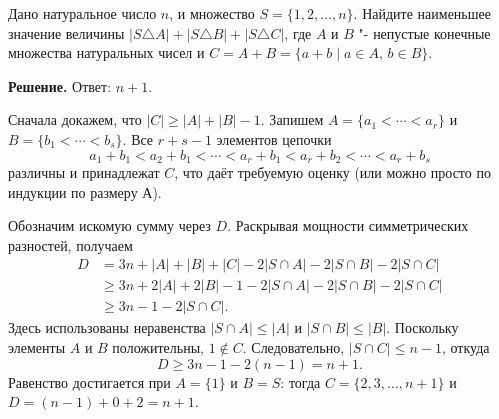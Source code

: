 \begin{problems}
\item Дано натуральное число $n$, и множество $S=\{1,2,\ldots,n\}$. Найдите наименьшее значение величины $|S\triangle A|+|S\triangle B|+|S\triangle C|$, где $A$ и $B$ "- непустые конечные множества натуральных чисел и $C=A+B=\{a+b \mid a\in A,\, b\in B\}$.
\par\smallskip\noindent\textbf{Решение.} Ответ: $n+1$.
\par Сначала докажем, что $|C|\ge |A|+|B|-1$. Запишем $A=\{a_1<\cdots<a_r\}$ и $B=\{b_1<\cdots<b_s\}$. Все $r+s-1$ элементов цепочки
\[
a_1+b_1<a_2+b_1<\cdots<a_r+b_1<a_r+b_2<\cdots<a_r+b_s
\]
различны и принадлежат $C$, что даёт требуемую оценку (или можно просто по индукции по размеру А).
\par Обозначим искомую сумму через $D$. Раскрывая мощности симметрических разностей, получаем
\[
\begin{aligned}
D&=3n+|A|+|B|+|C|-2|S\cap A|-2|S\cap B|-2|S\cap C|\\
 &\ge 3n+2|A|+2|B|-1-2|S\cap A|-2|S\cap B|-2|S\cap C|\\
 &\ge 3n-1-2|S\cap C|.
\end{aligned}
\]
Здесь использованы неравенства $|S\cap A|\le |A|$ и $|S\cap B|\le |B|$. Поскольку элементы $A$ и $B$ положительны, $1\notin C$. Следовательно, $|S\cap C|\le n-1$, откуда
\[
D\ge3n-1-2(n-1)=n+1.
\]
Равенство достигается при $A=\{1\}$ и $B=S$: тогда $C=\{2,3,\ldots,n+1\}$ и $D=(n-1)+0+2=n+1$.\par

\end{problems}

